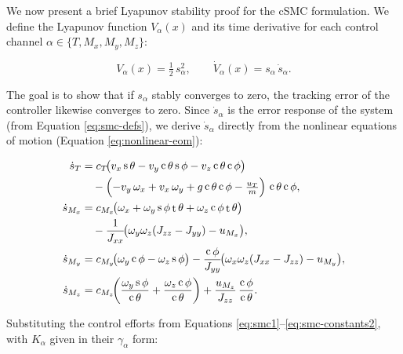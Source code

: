 \documentclass[conf]{new-aiaa}
\DeclareMathOperator{\s}{s}
\DeclareMathOperator{\cs}{c}
\DeclareMathOperator{\tn}{t}
\begin{document}
We now present a brief Lyapunov stability proof for the cSMC formulation. We define the Lyapunov function $V_\alpha(x)$ and its time derivative for each control channel $\alpha \in \{T, M_x, M_y, M_z\}$:

\small
\begin{equation}
\label{eq:lyapunov}
V_\alpha(x) = \tfrac{1}{2}\, s_\alpha^2, \qquad
\dot V_\alpha(x) = s_\alpha\, \dot s_\alpha.
\end{equation}
\normalsize

The goal is to show that if $s_\alpha$ stably converges to zero, the tracking error of the controller likewise converges to zero. Since $\dot{s}_\alpha$ is the error response of the system (from Equation \ref{eq:smc-defs}), we derive $\dot s_\alpha$ directly from the nonlinear equations of motion (Equation \ref{eq:nonlinear-eom}):

\small
\begingroup
\setlength{\jot}{1pt}
\begin{equation}
\label{eq:sdot-from-eom}
\begin{aligned}
\dot s_T
&= c_T\!\bigl(
v_x \s\theta - v_y \cs\theta \s\phi - v_z \cs\theta \cs\phi
\bigr) \\
&\quad - \Bigl(
-v_y \,\omega_x + v_x \,\omega_y + g \cs\theta \cs\phi - \tfrac{u_T}{m}
\Bigr)\, \cs\theta \cs\phi,
\\
\dot s_{M_x}
&= c_{M_x} \!\bigl(
\omega_x + \omega_y \s\phi \tn\theta + \omega_z \cs\phi \tn\theta
\bigr) \\
&\quad - \frac{1}{J_{xx}}\!\bigl(
\omega_y \omega_z (J_{zz} - J_{yy}) - u_{M_x}
\bigr),
\\
\dot s_{M_y}
&= c_{M_y} \!\bigl(
\omega_y \cs\phi - \omega_z \s\phi
\bigr) - \frac{\cs\phi}{J_{yy}}\!\bigl(
\omega_x \omega_z (J_{xx} - J_{zz}) - u_{M_y}
\bigr),
\\
\dot s_{M_z}
&= c_{M_z} \!\biggl(
\frac{\omega_y \s\phi}{\cs\theta} + \frac{\omega_z \cs\phi}{\cs\theta}
\biggr) + \frac{u_{M_z}}{J_{zz}}\, \frac{\cs\phi}{\cs\theta}.
\end{aligned}
\end{equation}
\endgroup
\normalsize

Substituting the control efforts from Equations \ref{eq:smc1}–\ref{eq:smc-constants2}, with $K_\alpha$ given in their $\gamma_\alpha$ form:
\end{document}
